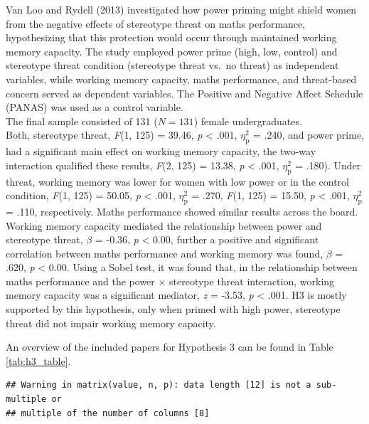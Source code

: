 \documentclass[
  stu, a4paper,floatsintext]{apa7}
\begin{document}
Van Loo and Rydell (2013) investigated how power priming might shield women from the negative effects of stereotype threat on maths performance, hypothesizing that this protection would occur through maintained working memory capacity.
The study employed power prime (high, low, control) and stereotype threat condition (stereotype threat vs.~no threat) as independent variables, while working memory capacity, maths performance, and threat-based concern served as dependent variables.
The Positive and Negative Affect Schedule (PANAS) was used as a control variable.\\
The final sample consisted of 131 (\(N = 131\)) female undergraduates.\\
Both, stereotype threat, \emph{F}(1, 125) = 39.46, \emph{p} \textless{} .001, \(\eta^{2}_{\text{p}}\) = .240, and power prime, had a significant main effect on working memory capacity, the two-way interaction qualified these results, \emph{F}(2, 125) = 13.38, \emph{p} \textless{} .001, \(\eta^{2}_{\text{p}}\) = .180).
Under threat, working memory was lower for women with low power or in the control condition, \emph{F}(1, 125) = 50.05, \emph{p} \textless{} .001, \(\eta^{2}_{\text{p}}\) = .270, \emph{F}(1, 125) = 15.50, \emph{p} \textless{} .001, \(\eta^{2}_{\text{p}}\) = .110, respectively.
Maths performance showed similar results across the board.
Working memory capacity mediated the relationship between power and stereotype threat, \(\beta\) = -0.36, \emph{p} \textless{} 0.00, further a positive and significant correlation between maths performance and working memory was found, \(\beta\) = .620, \emph{p} \textless{} 0.00.
Using a Sobel test, it was found that, in the relationship between maths performance and the power \(\times\) stereotype threat interaction, working memory capacity was a significant mediator, \emph{z} = -3.53, \emph{p} \textless{} .001.
H3 is mostly supported by this hypothesis, only when primed with high power, stereotype threat did not impair working memory capacity.

An overview of the included papers for Hypothesis 3 can be found in Table \ref{tab:h3_table}.

\begin{verbatim}
## Warning in matrix(value, n, p): data length [12] is not a sub-multiple or
## multiple of the number of columns [8]
\end{verbatim}
\end{document}
